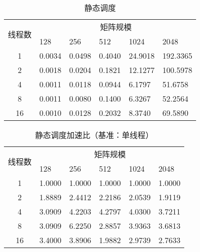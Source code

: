 \documentclass{SYSUReport}
\begin{document}
\begin{table}[H]
\centering
\caption{静态调度}
\label{表2}
\begin{tabular}{|c|lllll|}
\hline
\multirow{2}{*}{线程数} & \multicolumn{5}{c|}{矩阵规模}                                                                        \\ \cline{2-6} 
 & \multicolumn{1}{l|}{128} & \multicolumn{1}{l|}{256} & \multicolumn{1}{l|}{512} & \multicolumn{1}{l|}{1024} & 2048 \\ \hline
1                    & \multicolumn{1}{l|}{0.0034} & \multicolumn{1}{l|}{0.0498} & \multicolumn{1}{l|}{0.4040} & \multicolumn{1}{l|}{24.9018} &192.3365  \\ \hline
2                    & \multicolumn{1}{l|}{0.0018} & \multicolumn{1}{l|}{0.0204} & \multicolumn{1}{l|}{0.1821} & \multicolumn{1}{l|}{12.1277} &100.5978  \\ \hline
4                    & \multicolumn{1}{l|}{0.0011} & \multicolumn{1}{l|}{0.0118} & \multicolumn{1}{l|}{0.0944} & \multicolumn{1}{l|}{6.1797} &51.6758  \\ \hline
8                   & \multicolumn{1}{l|}{0.0011} & \multicolumn{1}{l|}{0.0080} & \multicolumn{1}{l|}{0.1400} & \multicolumn{1}{l|}{6.3267} & 52.2564 \\ \hline
16                   & \multicolumn{1}{l|}{0.0010} & \multicolumn{1}{l|}{0.0128} & \multicolumn{1}{l|}{0.2032} & \multicolumn{1}{l|}{8.3740} &69.5890  \\ \hline
\end{tabular}
\end{table}
\begin{table}[H]
    \centering
    \caption{静态调度加速比（基准：单线程）}
    \label{表2-加速比-修正}
    \begin{tabular}{|c|lllll|}
    \hline
    \multirow{2}{*}{线程数} & \multicolumn{5}{c|}{矩阵规模} \\ \cline{2-6} 
     & \multicolumn{1}{l|}{128} & \multicolumn{1}{l|}{256} & \multicolumn{1}{l|}{512} & \multicolumn{1}{l|}{1024} & 2048 \\ \hline
    1  & \multicolumn{1}{l|}{1.0000} & \multicolumn{1}{l|}{1.0000} & \multicolumn{1}{l|}{1.0000} & \multicolumn{1}{l|}{1.0000} & 1.0000 \\ \hline
    2  & \multicolumn{1}{l|}{1.8889} & \multicolumn{1}{l|}{2.4412} & \multicolumn{1}{l|}{2.2186} & \multicolumn{1}{l|}{2.0539} & 1.9119 \\ \hline
    4  & \multicolumn{1}{l|}{3.0909} & \multicolumn{1}{l|}{4.2203} & \multicolumn{1}{l|}{4.2797} & \multicolumn{1}{l|}{4.0300} & 3.7211 \\ \hline
    8  & \multicolumn{1}{l|}{3.0909} & \multicolumn{1}{l|}{6.2250} & \multicolumn{1}{l|}{2.8857} & \multicolumn{1}{l|}{3.9363} & 3.6813 \\ \hline
    16 & \multicolumn{1}{l|}{3.4000} & \multicolumn{1}{l|}{3.8906} & \multicolumn{1}{l|}{1.9882} & \multicolumn{1}{l|}{2.9739} & 2.7633 \\ \hline
    \end{tabular}
    \end{table}
\end{document}
